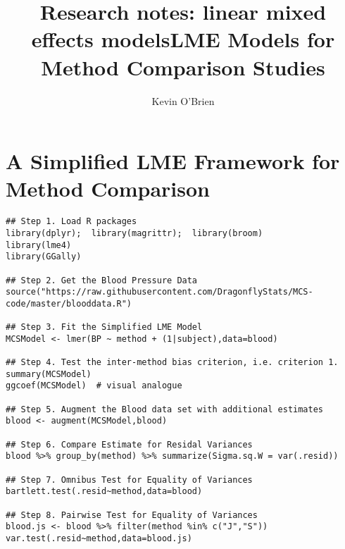 \documentclass[12pt, a4paper]{report}
\title{Research notes: linear mixed effects models}
\author{ } \date{ }
\theoremstyle{plain}
\theoremstyle{definition}
\theoremstyle{remark}
\begin{document}
\author{Kevin O'Brien}
\title{LME Models for Method Comparison Studies}

\chapter{A Simplified LME Framework for Method Comparison}
\newpage

\begin{verbatim}
## Step 1. Load R packages
library(dplyr);  library(magrittr);  library(broom)
library(lme4)
library(GGally)

## Step 2. Get the Blood Pressure Data
source("https://raw.githubusercontent.com/DragonflyStats/MCS-code/master/blooddata.R")

## Step 3. Fit the Simplified LME Model
MCSModel <- lmer(BP ~ method + (1|subject),data=blood)

## Step 4. Test the inter-method bias criterion, i.e. criterion 1.
summary(MCSModel)
ggcoef(MCSModel)  # visual analogue

## Step 5. Augment the Blood data set with additional estimates
blood <- augment(MCSModel,blood)

## Step 6. Compare Estimate for Residal Variances
blood %>% group_by(method) %>% summarize(Sigma.sq.W = var(.resid)) 

## Step 7. Omnibus Test for Equality of Variances
bartlett.test(.resid~method,data=blood)

## Step 8. Pairwise Test for Equality of Variances
blood.js <- blood %>% filter(method %in% c("J","S"))
var.test(.resid~method,data=blood.js)

\end{verbatim}




\end{document}
